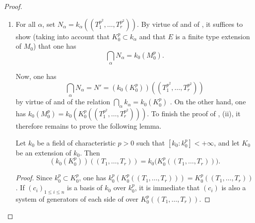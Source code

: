 \begin{proof}
\begin{enumerate}
  Applying  twice more to the first term on the right gives
  \[
    d(E/L_0,M/k_0)=d(E/L_0,M/N)+d(E/L_0,N/k)+d(E/L_0,k/k_0).
  \]
  Since $M\subset N(L_0^p)$, one has $d(E/L_0,M/N)=0$ ; hence, by ,
  \[
    \delta=d(E/L_0,k/k_0)+d(E/M_0,N/k).
  \]
  But $M_0$ and $L_0$ are separable extensions of $K_0$ , so $d(L_0/K_0,k/k_0)=d(M_0/K_0,k/k_0)=0$
  by .
  Applying  twice more,
  one has $d(E/L_0,k/k_0)=d(E/K_0,k/k_0)=d(E/M_0,k/k_0)$,
  and a final application of  gives
  \[
    \delta=d(E/M_0,N/k_0)\geqslant0
  \]
  which proves .

  Furthermore, when $k$ is replaced by an intermediate field $k'$ with $k_0\subset k'\subset k$, $N$ is replaced by a subextension $N'$, and therefore $d(E/M_0,N'/k_0)\leqslant d(E/M_0,N/k_0)$ .
  This proves the last assertion of (i).

  \item[(ii)] For all $\alpha$, set $N_\alpha=k_\alpha((T_1^{p^2},\ldots,T_r^{p^2}))$.
  By virtue of  and of , it suffices to show (taking into account that $K_0^p\subset k_\alpha$ and that $E$ is a finite type extension of $M_0$) that one has
  \[
    \bigcap_\alpha N_\alpha=k_0(M_0^p).
  \]

  Now, one has
  \begin{equation}
  \tag{21.9.6.6}
  \label{0.21.9.6.6}
    \bigcap_\alpha N_\alpha=N'=(k_0(K_0^p))((T_1^{p^2},\ldots,T_r^{p^2}))
  \end{equation}
  by virtue of  and of the relation $\bigcap_\alpha k_\alpha=k_0(K_0^p)$ .
  On the other hand, one has $k_0(M_0^p)=k_0(K_0^p((T_1^{p^2},\ldots,T_r^{p^2})))$.
  To finish the proof of , (ii), it therefore remains to prove the following lemma.

  \begin{lemma}[21.9.6.7]
  \label{0.21.9.6.7}
  Let $k_0$ be a field of characteristic $p>0$ such that $[k_0:k_0^p]<+\infty$, and let $K_0$ be an extension of $k_0$.
  Then
  \begin{equation}
  \tag{21.9.6.8}
    \label{0.21.9.6.8}
    (k_0(K_0^p))((T_1,\ldots,T_r))=k_0\bigl(K_0^p((T_1,\ldots,T_r))\bigr).
  \end{equation}
  \end{lemma}

  \begin{proof}
  Since $k_0^p\subset K_0^p$, one has $k_0^p(K_0^p((T_1,\ldots,T_r)))=K_0^p((T_1,\ldots,T_r))$.
  If $(c_i)_{1\leqslant i\leqslant n}$ is a basis of $k_0$ over $k_0^p$, it is immediate that $(c_i)$ is also a system of generators of each side of  over $K_0^p((T_1,\ldots,T_r))$.
  \end{proof}
\end{enumerate}
\end{proof}

